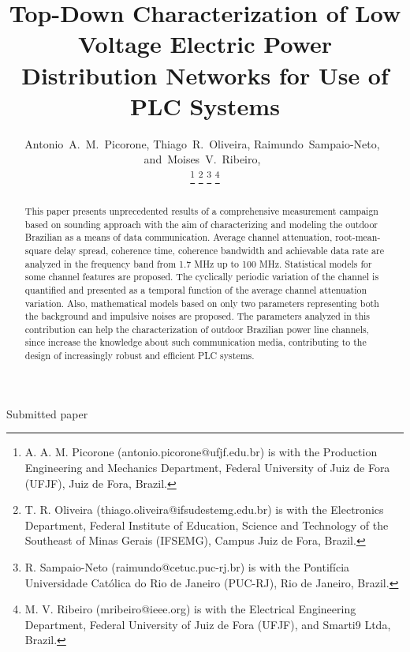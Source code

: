 \documentclass[journal]{IEEEtran}
\begin{document}
\title{\color{blue}Top-Down Characterization of Low Voltage Electric Power Distribution Networks for Use of PLC Systems}

\author{Antonio~A.~M.~Picorone,
        Thiago~R.~Oliveira,  
        Raimundo~Sampaio-Neto,~     
        and~Moises~V.~Ribeiro,~%

 \thanks{A. A. M. Picorone (antonio.picorone@ufjf.edu.br) is with the Production Engineering and Mechanics Department, Federal University of Juiz de Fora (UFJF), Juiz de Fora, Brazil.}%
 \thanks{T. R. Oliveira (thiago.oliveira@ifsudestemg.edu.br) is with the Electronics Department, Federal Institute of Education, Science and Technology of the Southeast of Minas Gerais (IFSEMG), Campus Juiz de Fora, Brazil.}%
 \thanks{R. Sampaio-Neto (raimundo@cetuc.puc-rj.br) is with the Pontif\'icia Universidade Cat\'olica do Rio de Janeiro (PUC-RJ), Rio de Janeiro, Brazil.}%
\thanks{M. V. Ribeiro (mribeiro@ieee.org) is with the Electrical Engineering Department,
Federal University of Juiz de Fora (UFJF), and Smarti9 Ltda, Brazil.}%
}

%
{Submitted paper}

\maketitle

\begin{abstract}
This paper presents unprecedented results of a comprehensive measurement campaign based on sounding approach with the aim of characterizing and modeling the outdoor Brazilian as a means of data communication. Average channel attenuation, root-mean-square delay spread, coherence time, coherence bandwidth and achievable data rate are analyzed in the frequency band from 1.7 MHz up to 100 MHz. Statistical models for some channel features are proposed. The cyclically periodic variation of the channel is quantified and presented as a temporal function of the average channel attenuation variation. Also, mathematical models based on only two parameters representing both the background and impulsive noises are proposed. The parameters analyzed in this contribution can help the characterization of outdoor Brazilian power line channels, since increase the knowledge about such communication media, contributing to the design of increasingly robust and efficient PLC systems.
\end{abstract}
\end{document}
